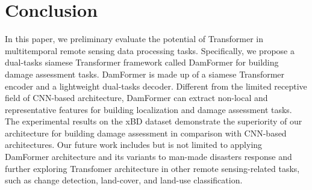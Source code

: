\documentclass{article}
\begin{document}
\section{Conclusion}
\label{sec:conclusion}

\par In this paper, we preliminary evaluate the potential of Transformer in multitemporal remote sensing data processing tasks. Specifically, we propose a dual-tasks siamese Transformer framework called DamFormer for building damage assessment tasks. DamFormer is made up of a siamese Transformer encoder and a lightweight dual-tasks decoder. Different from the limited receptive field of CNN-based architecture, DamFormer can extract non-local and representative features for building localization and damage assessment tasks. The experimental results on the xBD dataset demonstrate the superiority of our architecture for building damage assessment in comparison with CNN-based architectures. Our future work includes but is not limited to applying DamFormer architecture and its variants to man-made disasters response and further exploring Transfomer architecture in other remote sensing-related tasks, such as change detection, land-cover, and land-use classification.




\small


\end{document}
